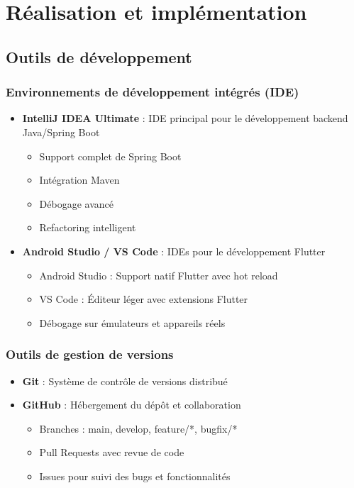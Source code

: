 \documentclass[a4paper,11pt]{report}
\begin{document}
\chapter{Réalisation et implémentation}

\section{Outils de développement}

\subsection{Environnements de développement intégrés (IDE)}

\begin{itemize}
    \item \textbf{IntelliJ IDEA Ultimate} : IDE principal pour le développement backend Java/Spring Boot
    \begin{itemize}
        \item Support complet de Spring Boot
        \item Intégration Maven
        \item Débogage avancé
        \item Refactoring intelligent
    \end{itemize}
    
    \item \textbf{Android Studio / VS Code} : IDEs pour le développement Flutter
    \begin{itemize}
        \item Android Studio : Support natif Flutter avec hot reload
        \item VS Code : Éditeur léger avec extensions Flutter
        \item Débogage sur émulateurs et appareils réels
    \end{itemize}
\end{itemize}

\subsection{Outils de gestion de versions}

\begin{itemize}
    \item \textbf{Git} : Système de contrôle de versions distribué
    \item \textbf{GitHub} : Hébergement du dépôt et collaboration
    \begin{itemize}
        \item Branches : main, develop, feature/*, bugfix/*
        \item Pull Requests avec revue de code
        \item Issues pour suivi des bugs et fonctionnalités
    \end{itemize}
\end{itemize}
\end{document}
